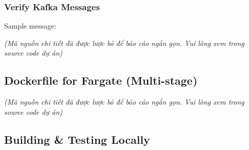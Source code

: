 \hypertarget{verify-kafka-messages}{%
\subsubsection{Verify Kafka Messages}}

\begin{Shaded}
\begin{Highlighting}[]
\DataTypeTok{\textbackslash{}}
  \DataTypeTok{\textbackslash{}}
  \DataTypeTok{\textbackslash{}}
   \DataTypeTok{\textbackslash{}}
\end{Highlighting}
\end{Shaded}

Sample message:

\emph{(Mã nguồn chi tiết đã được lược bỏ để báo cáo ngắn gọn. Vui lòng
xem trong source code dự án)}

\hypertarget{dockerfile-for-fargate-multi-stage}{%
\subsection{Dockerfile for Fargate
(Multi-stage)}}

\emph{(Mã nguồn chi tiết đã được lược bỏ để báo cáo ngắn gọn. Vui lòng
xem trong source code dự án)}

\hypertarget{building-testing-locally}{%
\subsection{Building \& Testing
Locally}}

\begin{Shaded}
\begin{Highlighting}[]

 \DataTypeTok{\textbackslash{}}
  \DataTypeTok{\textbackslash{}}
  \DataTypeTok{\textbackslash{}}
  \DataTypeTok{\textbackslash{}}
\end{Highlighting}
\end{Shaded}

